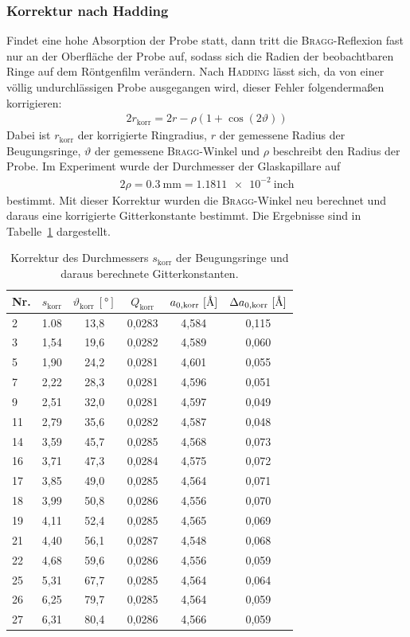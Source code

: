\documentclass[a4paper,twoside,final]{article}
\begin{document}
\subsubsection{Korrektur nach Hadding}
Findet eine hohe Absorption der Probe statt, dann tritt die \textsc{Bragg}-Reflexion fast nur an der Oberfläche der Probe auf, sodass sich die Radien der beobachtbaren Ringe auf dem Röntgenfilm verändern. Nach \textsc{Hadding} lässt sich, da von einer völlig undurchlässigen Probe ausgegangen wird, dieser Fehler folgendermaßen korrigieren:
\begin{align}
  2r_\text{korr} = 2r - \rho (1+\cos(2\vartheta))
\end{align}
Dabei ist $r_\text{korr}$ der korrigierte Ringradius, $r$ der gemessene Radius der Beugungsringe, $\vartheta$ der gemessene \textsc{Bragg}-Winkel und $\rho$ beschreibt den Radius der Probe. Im Experiment wurde der Durchmesser der Glaskapillare auf
\begin{align}
  2\rho = \SI{0,3}{\milli\metre} = \SI{1,1811e-2}{\text{inch}}
\end{align}
bestimmt. Mit dieser Korrektur wurden die \textsc{Bragg}-Winkel neu berechnet und daraus eine korrigierte Gitterkonstante bestimmt. Die Ergebnisse sind in Tabelle~\ref{tab:Hadding} dargestellt.
\begin{table}[ht]
	\centering
	\caption{Korrektur des Durchmessers $s_\text{korr}$ der Beugungsringe und daraus berechnete Gitterkonstanten.}
	\label{tab:Hadding}
	\begin{tabular}{l c c c c c}
		\toprule
      Nr. & $s_\text{korr}$ & $\vartheta_\text{korr}~[\si{\degree}]$ & $Q_\text{korr}$ & $a_{0,\text{korr}}~[\si{\textup{\AA}}]$ & $\Delta a_{0,\text{korr}}~[\si{\textup{\AA}}]$\\
    \midrule
    2  & 1.08 & 13,8 & 0,0283 & 4,584 & 0,115 \\
    3  & 1,54 & 19,6 & 0,0282 & 4,589 & 0,060 \\
    5  & 1,90 & 24,2 & 0,0281 & 4,601 & 0,055 \\
    7  & 2,22 & 28,3 & 0,0281 & 4,596 & 0,051 \\
    9  & 2,51 & 32,0 & 0,0281 & 4,597 & 0,049 \\
    11 & 2,79 & 35,6 & 0,0282 & 4,587 & 0,048 \\
    14 & 3,59 & 45,7 & 0,0285 & 4,568 & 0,073 \\
    16 & 3,71 & 47,3 & 0,0284 & 4,575 & 0,072 \\
    17 & 3,85 & 49,0 & 0,0285 & 4,564 & 0,071 \\
    18 & 3,99 & 50,8 & 0,0286 & 4,556 & 0,070 \\
    19 & 4,11 & 52,4 & 0,0285 & 4,565 & 0,069 \\
    21 & 4,40 & 56,1 & 0,0287 & 4,548 & 0,068 \\
    22 & 4,68 & 59,6 & 0,0286 & 4,556 & 0,059 \\
    25 & 5,31 & 67,7 & 0,0285 & 4,564 & 0,064 \\
    26 & 6,25 & 79,7 & 0,0285 & 4,564 & 0,059 \\
    27 & 6,31 & 80,4 & 0,0286 & 4,566 & 0,059
	\end{tabular}
\end{table}
\end{document}
